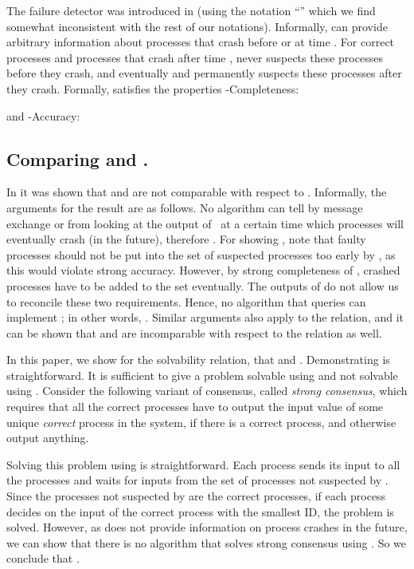 \documentclass[11pt]{article}
\newcommand{\emn}[1]{{\em #1\/}}
\begin{document}
     
 

The  failure detector was introduced in \cite{bhatt:oteow}
     (using the notation ``'' which we find somewhat
     inconsistent with the rest of our notations).
Informally,  can provide arbitrary information about processes
     that crash before or at time .
For correct processes and processes that crash after time ,
      never suspects these processes before they crash, and
      eventually and permanently suspects these processes
     after they crash.
Formally,  satisfies the properties -Completeness: 

and -Accuracy:



\subsection{Comparing  and .}

In \cite{guer:01:hfap} it was shown that  and  are not
     comparable with respect to .
Informally, the arguments for the result are as follows.
No algorithm can tell by message exchange or from looking at the
     output of~ at a certain time which processes will
     eventually crash (in the future), therefore .
For showing , note that faulty processes should
     not be put into the set of suspected processes too early by
     , as this would violate strong accuracy.
However, by strong completeness of , crashed processes have to
     be added to the set eventually.
The outputs of  do not allow us to reconcile these two
     requirements.
Hence, no algorithm that queries  can implement ; in other
     words, .
Similar arguments also apply to the  relation, and it can be
     shown that  and  are incomparable with respect to the
      relation as well.

In this paper, we show for the solvability relation, that
      and .
Demonstrating  is straightforward.
It is sufficient to give a problem solvable using  and not
     solvable using .
Consider the following variant of consensus, called \emn{strong
     consensus}, which requires that all the correct processes have to
     output the input value of some unique \emph{correct} process in
     the system, if there is a correct process, and otherwise output
     anything.

Solving this problem using  is straightforward.
Each process sends its input to all the processes and waits for inputs
     from  the set of processes not suspected by .
Since the processes not suspected by  are the correct processes,
     if each process decides on the input of the correct process with
     the smallest ID, the problem is solved.
However, as  does not provide information on process crashes in
     the future, we can show that there is no algorithm that solves
     strong consensus using .
So we conclude that .
\end{document}
